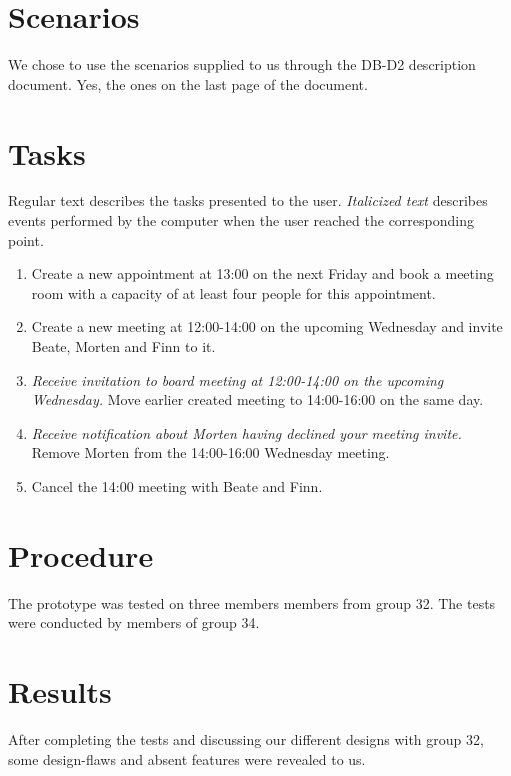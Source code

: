 \documentclass{article}
\begin{document}
\section{Scenarios}

We chose to use the scenarios supplied to us through the DB-D2 description
document. Yes, the ones on the last page of the document.

\section{Tasks}

Regular text describes the tasks presented to the user. \textit{Italicized
text} describes events performed by the computer when the user reached the
corresponding point.

\begin{enumerate}
\item Create a new appointment at 13:00 on the next Friday and book a
meeting room with a capacity of at least four people for this appointment.

\item Create a new meeting at 12:00-14:00 on the upcoming Wednesday and
invite Beate, Morten and Finn to it.

\item \textit{Receive invitation to board meeting at 12:00-14:00 on the
upcoming Wednesday. }Move earlier created meeting to 14:00-16:00 on the same
day.

\item \textit{Receive notification about Morten having declined your meeting
invite. }Remove Morten from the 14:00-16:00 Wednesday meeting.

\item Cancel the 14:00 meeting with Beate and Finn.
\end{enumerate}

\section{Procedure}

The prototype was tested on three members members from group 32. The tests
were conducted by members of group 34.

\section{Results}

After completing the tests and discussing our different designs with group
32, some design-flaws and absent features were revealed to us.
\end{document}

